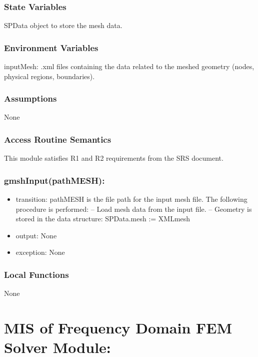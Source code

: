 \documentclass[12pt, titlepage]{article}
\begin{document}
	\subsubsection{State Variables}
	
	SPData object to store the mesh data.
	
	\subsubsection{Environment Variables} inputMesh: .xml files containing the data
	related to the meshed geometry (nodes, physical regions, boundaries).
	
	\subsubsection{Assumptions}
	
	None
	
	\subsubsection{Access Routine Semantics}
	
	This module satisfies R1 and R2 requirements from the SRS document.
	
	\subsubsection*{gmshInput(pathMESH):} \begin{itemize} \item transition:
		pathMESH is the file path for the input mesh file. The following procedure is
		performed: \subitem -- Load mesh data from the input file. \subitem  --
		Geometry is stored in the data structure: SPData.mesh := XMLmesh
		
		\item output: None \item exception: None \\
		
	\end{itemize}
	
	\subsubsection{Local Functions}
	
	None \newpage %
	\section{MIS of Frequency Domain FEM Solver Module:} \label{FDSM}
	
\end{document}
